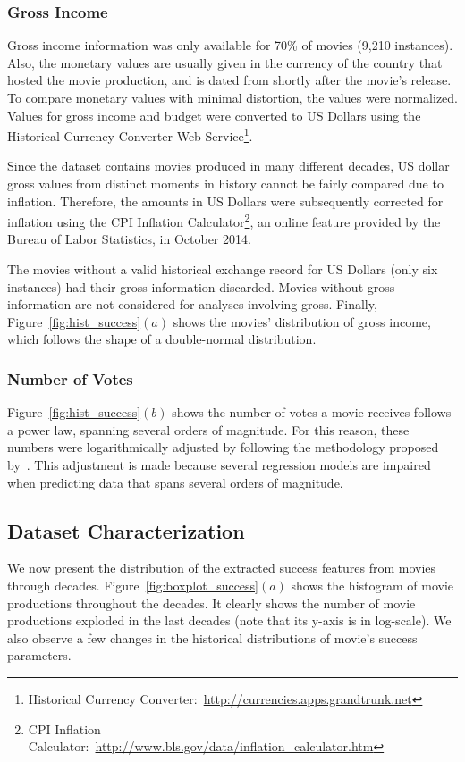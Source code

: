 \subsubsection{Gross Income}
Gross income information was only available for 70\% of movies (9,210
instances). Also, the monetary values are usually given in the currency of the
country that hosted the movie production, and is dated from shortly after the
movie's release. To compare monetary values with minimal distortion, the values
were normalized. Values for gross income and budget were converted to US
Dollars using the Historical Currency Converter Web Service\footnote{Historical
Currency Converter:~\url{http://currencies.apps.grandtrunk.net}}.

Since the dataset contains movies produced in many different decades, US dollar
gross values from distinct moments in history cannot be fairly compared due to
inflation. Therefore, the amounts in US Dollars were subsequently corrected for
inflation using the CPI Inflation Calculator\footnote{CPI Inflation
Calculator:~\url{http://www.bls.gov/data/inflation\_calculator.htm}}, an online
feature provided by the Bureau of Labor Statistics, in October 2014.

The movies without a valid historical exchange record for US Dollars (only six
instances) had their gross information discarded. Movies without gross
information are not considered for analyses involving gross. Finally,
Figure~\ref{fig:hist_success}$(a)$ shows the movies' distribution of gross
income, which follows the shape of a double-normal distribution.

\subsubsection{Number of Votes}
Figure~\ref{fig:hist_success}$(b)$ shows the number of votes a movie
receives follows a power law, spanning several orders of magnitude. For this
reason, these numbers were logarithmically adjusted by following the methodology
proposed by~\cite{ASI:ASI23213}. This adjustment is made because several
regression models are impaired when predicting data that spans several
orders of magnitude.

\subsection{Dataset Characterization}
We now present the distribution of the extracted success features from movies
through decades. Figure~\ref{fig:boxplot_success}$(a)$ shows the histogram of
movie productions throughout the decades. It clearly shows the number of movie
productions exploded in the last decades (note that its y-axis is in
log-scale). We also observe a few changes in the historical distributions of
movie's success parameters.

